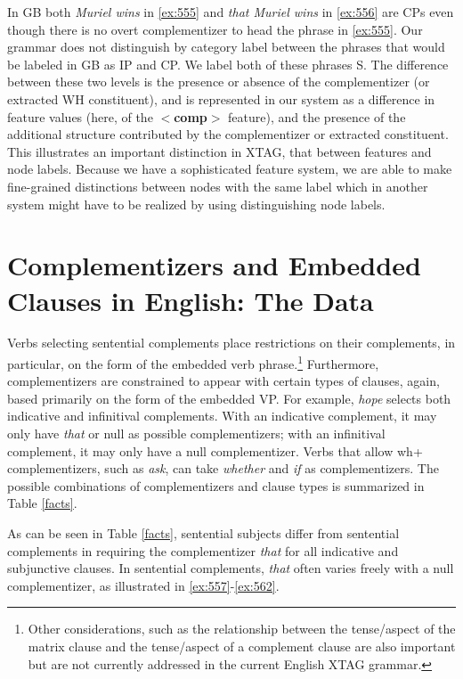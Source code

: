 \beginsentences
{}\label{ex:555} 
\label{ex:556} 
\endsentences

 
 In GB both {\it Muriel wins} in \ref{ex:555} and {\it that Muriel wins} in 
\ref{ex:556} are CPs even though there is no overt complementizer to head the 
phrase in \ref{ex:555}.  Our grammar does not distinguish by category label 
between the phrases that would be labeled in GB as IP and CP.  We label 
both of these phrases S.  The difference between these two levels is the 
presence or absence of the complementizer (or extracted WH constituent), and is 
represented in our system as a difference in feature values (here, of the {\bf $<$comp$>$} feature), and the presence of the additional structure contributed 
by the complementizer or extracted constituent.  This illustrates an important 
distinction in XTAG, that between features and node labels.  Because we have a 
sophisticated feature system, we are able to make fine-grained distinctions 
between nodes with the same label which in another system might have to be 
realized by using distinguishing node labels. 
 
\section{Complementizers and Embedded Clauses in English:  The Data} 
\label{data} 
 
Verbs selecting sentential complements place restrictions on 
their complements, in particular, on the form of the embedded verb 
phrase.\footnote{Other considerations, such as the relationship between the tense/aspect of the matrix clause and the tense/aspect of a complement clause are also important but are not currently addressed in the current English XTAG grammar.}  Furthermore, complementizers are constrained to appear with certain 
types of clauses, again, based primarily on the form of the embedded VP.  For 
example, {\it hope\/} selects both indicative and infinitival complements. With 
an indicative complement, it may only have {\it that\/} or null as possible 
complementizers; with an infinitival complement, it may only have a null 
complementizer.  Verbs that allow wh+ complementizers, such as {\it ask}, can 
take {\it whether} and {\it if} as complementizers.  The possible combinations 
of complementizers and clause types is summarized in Table \ref{facts}. 
 
As can be seen in Table \ref{facts}, sentential subjects differ from 
sentential complements in requiring the complementizer {\it that\/} 
for all indicative and subjunctive clauses.  In sentential complements, 
{\it that\/} often varies freely with a null complementizer, as 
illustrated in \ref{ex:557}-\ref{ex:562}. 
 
